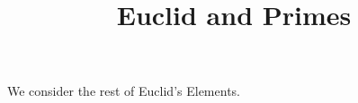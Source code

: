 \documentclass{ximera}
\title{Euclid and Primes}
\begin{document}
\begin{abstract}
\end{abstract}
\maketitle

We consider the rest of Euclid's Elements.
\end{document}
